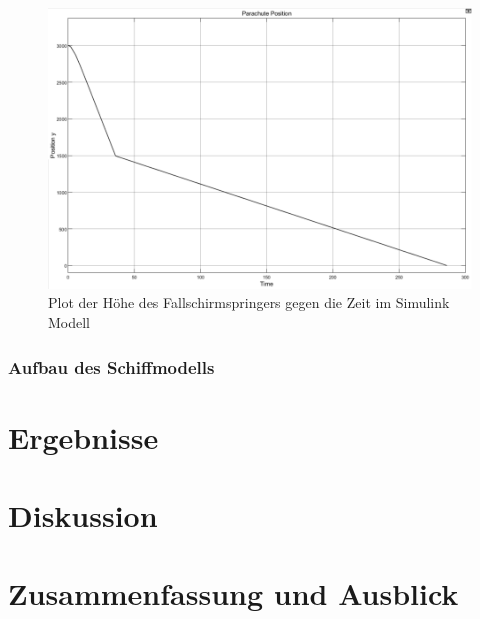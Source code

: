 \documentclass[]{iat}
\begin{document}
\begin{figure}[H]
    \includegraphics[width=\textwidth]{graphics/simulink_parachute_s_plot.png}
    \centering
    \caption{Plot der Höhe des Fallschirmspringers gegen die Zeit im Simulink Modell}
    \label{fig:simulink_parachute_s_plot}
\end{figure}

\newpage
\subsection{Aufbau des Schiffmodells}

\chapter{Ergebnisse}

\chapter{Diskussion}

\chapter{Zusammenfassung und Ausblick}
\end{document}
